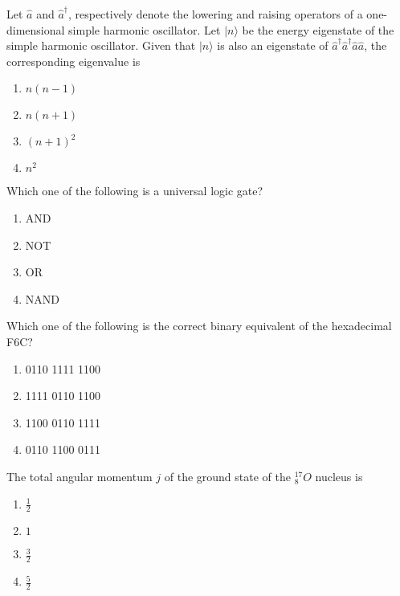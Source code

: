 \iffalse
\chapter{2020}
\author{EE24BTECH11040}
\section{ph}
\fi

\item Let $\hat{a}$ and $\hat{a}^\dagger$, respectively denote the lowering and raising operators of a one-dimensional simple harmonic oscillator. Let $|n\rangle$ be the energy eigenstate of the simple harmonic oscillator. Given that $|n\rangle$ is also an eigenstate of $\hat{a}^\dagger\hat{a}^\dagger\hat{a}\hat{a}$, the corresponding eigenvalue is

\begin{enumerate}
\item $n(n-1)$
\item $n(n+1)$
\item $(n+1)^2$
\item $n^2$
\end{enumerate}

\item Which one of the following is a universal logic gate?

\begin{enumerate}
\item AND
\item NOT
\item OR
\item NAND
\end{enumerate}

\item Which one of the following is the correct binary equivalent of the hexadecimal F6C?

\begin{enumerate}
\item 0110 1111 1100
\item 1111 0110 1100
\item 1100 0110 1111
\item 0110 1100 0111
\end{enumerate}

\item The total angular momentum $j$ of the ground state of the ${}^{17}_{8}O$ nucleus is

\begin{enumerate}
\item $\frac{1}{2}$
\item $1$
\item $\frac{3}{2}$
\item $\frac{5}{2}$
\end{enumerate}

